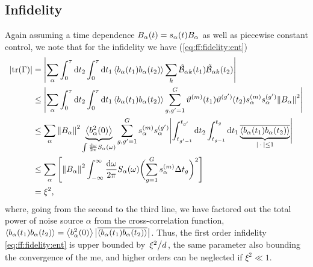 \subsection{Infidelity}\label{subsec:app:ff:convergence:infidelity}
Again assuming a time dependence $B_\alpha(t) = s_\alpha(t)B_\alpha$ as well as piecewise constant control, we note that for the infidelity we have (\cf \cref{eq:ff:fidelity:ent})
\begin{equation}
    \begin{split}
        \abs{\tr(\decayamps)} &= \abs\Bigg{\sum_{\alpha}\int_0^\tau\dd{t_2}\int_0^\tau\dd{t_1}
                                 \expval{b_\alpha(t_1)b_\alpha(t_2)}\sum_{k}\ctrlmat_{\alpha k}(t_1)\ctrlmat_{\alpha k}(t_2)} \\
                              &\leq\abs\Bigg{\sum_{\alpha}\int_0^\tau\dd{t_2}\int_0^\tau\dd{t_1}
                                 \expval{b_\alpha(t_1)b_\alpha(t_2)}\sum_{g,g^\prime=1}^{G}\vartheta\gth{m}(t_1)\vartheta^{(g^\prime)}(t_2)
                                 s_\alpha\gth{m} s_\alpha^{(g^\prime)} \norm{B_\alpha}^2} \\
                              &\leq\sum_{\alpha}\norm{B_\alpha}^2
                                 \underbrace{\expval{b_\alpha^2(0)}}_{\int\frac{\dd{\omega}}{2\pi}S_\alpha(\omega)}
                                 \sum_{g,g^\prime=1}^{G} s_\alpha\gth{m} s_\alpha^{(g^\prime)}
                                 \abs\Bigg{\int_{t_{g^\prime-1}}^{t_{g^\prime}}\dd{t_2}\int_{t_{g-1}}^{t_g}\dd{t_1}
                                 \underbrace{\overline{\expval{b_\alpha(t_1)b_\alpha(t_2)}}}_{\abs{\placeholder}\leq 1}} \\
                              &\leq\sum_{\alpha}\left[\norm{B_\alpha}^2
                                 \int_{-\infty}^\infty\frac{\mathrm{d}\omega}{2\pi}S_\alpha(\omega)
                                 \biggl(\sum_{g=1}^{G}s_\alpha\gth{m}\Delta t_g\biggr)^2\right] \\
                              &= \xi^2,
    \end{split}
\end{equation}
where, going from the second to the third line, we have factored out the total power of noise source $\alpha$ from the cross-correlation function, $\expval{b_\alpha(t_1) b_\alpha(t_2)} = \expval{b_\alpha^2(0)}\bigl\lvert\overline{\expval{b_\alpha(t_1)b_\alpha(t_2)}}\bigr\rvert$.
Thus, the first order infidelity \cref{eq:ff:fidelity:ent} is upper bounded by $\flatfrac{\xi^2}{d}$, the same parameter also bounding the convergence of the \gls{me}, and higher orders can be neglected if $\xi^2\ll 1$.

